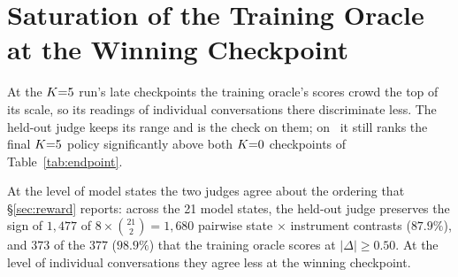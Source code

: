 \section{Saturation of the Training Oracle at the Winning Checkpoint}
\label{app:saturation}

At the $K{=}5$ run's late checkpoints the training oracle's scores crowd the top of its scale, so its
readings of individual conversations there discriminate less. The held-out judge keeps its range
and is the check on them; on \QQ\ it still ranks the final $K{=}5$ policy significantly above both
$K{=}0$ checkpoints of Table~\ref{tab:endpoint}.

At the level of model states the two judges agree about the ordering that \S\ref{sec:reward}
reports: across the 21 model states, the held-out judge preserves the sign of $1{,}477$ of
$8 \times \binom{21}{2} = 1{,}680$ pairwise state $\times$ instrument contrasts ($87.9\%$), and
$373$ of the $377$ ($98.9\%$) that the training oracle scores at $|\Delta| \geq 0.50$. At the level
of individual conversations they agree less at the winning checkpoint.

